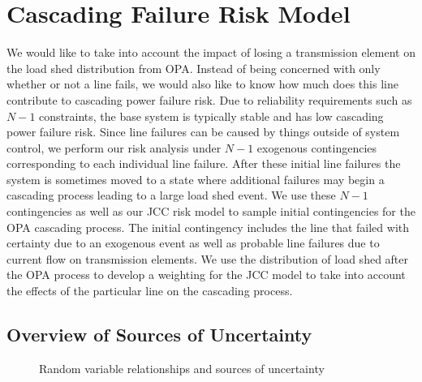 \section{Cascading Failure Risk Model}
We would like to take into account the impact of losing a transmission element on the load shed distribution from OPA.  Instead of being concerned with only whether or not a line fails, we would also like to know how much does this line contribute to cascading power failure risk.  Due to reliability requirements such as $N-1$ constraints, the base system is typically stable and has low cascading power failure risk.  Since line failures can be caused by things outside of system control, we perform our risk analysis under $N-1$ exogenous contingencies corresponding to each individual line failure.  After these initial line failures the system is sometimes moved to a state where additional failures may begin a cascading process leading to a large load shed event.  We use these $N-1$ contingencies as well as our JCC risk model to sample initial contingencies for the OPA cascading process.  The initial contingency includes the line that failed with certainty due to an exogenous event as well as probable line failures due to current flow on transmission elements.  We use the distribution of load shed after the OPA process to develop a weighting for the  JCC model to take into account the effects of the particular line on the cascading process. 

\subsection{Overview of Sources of Uncertainty}

\begin{figure}
\centering
{} 
\caption{Random variable relationships and sources of uncertainty}\label{randomrelationship}
\end{figure}

